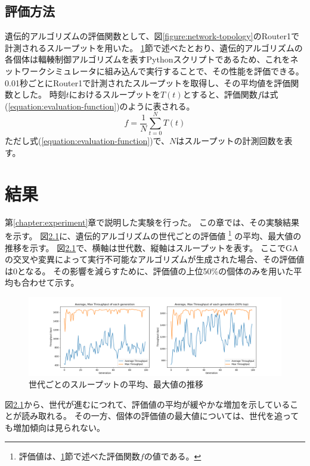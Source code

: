 \documentclass[a4paper,11pt]{jreport}
\newcommand{\figref}[1]{図\ref{#1}}
\newcommand{\chapref}[1]{第\ref{#1}章}
\newcommand{\secref}[1]{\ref{#1}節}
\newcommand{\equationref}[1]{式(\ref{#1})}
\begin{document}
\section{評価方法}
\label{section:evaluation-method}

遺伝的アルゴリズムの評価関数として、\figref{figure:network-topology}のRouter1で計測されるスループットを用いた。
\secref{section:evaluation-method}で述べたとおり、遺伝的アルゴリズムの各個体は輻輳制御アルゴリズムを表すPythonスクリプトであるため、これをネットワークシミュレータに組み込んで実行することで、その性能を評価できる。
0.01秒ごとにRouter1で計測されたスループットを取得し、その平均値を評価関数とした。
時刻$t$におけるスループットを$T(t)$とすると、評価関数$f$は\equationref{equation:evaluation-function}のように表される。
\begin{equation}
  \label{equation:evaluation-function}
  f = \frac{1}{N} \sum_{t=0}^{N} T(t)
\end{equation}
ただし\equationref{equation:evaluation-function}で、$N$はスループットの計測回数を表す。

\newpage

\chapter{結果}

\label{chapter:result}
\chapref{chapter:experiment}で説明した実験を行った。
この章では、その実験結果を示す。
\figref{figure:generation_throughput}に、遺伝的アルゴリズムの世代ごとの評価値
\footnote{評価値は、\secref{section:evaluation-method}で述べた評価関数$f$の値である。}
の平均、最大値の推移を示す。
\figref{figure:generation_throughput}で、横軸は世代数、縦軸はスループットを表す。
ここでGAの交叉や変異によって実行不可能なアルゴリズムが生成された場合、その評価値は0となる。
その影響を減らすために、評価値の上位50\%の個体のみを用いた平均も合わせて示す。
\begin{figure}[thbp]
  \setlength\fboxsep{0pt}
  \centering
  \includegraphics[width=0.9\linewidth]{fig/chap05/generation_throughput.png}
  \caption{世代ごとのスループットの平均、最大値の推移}
  \label{figure:generation_throughput}
\end{figure}
\figref{figure:generation_throughput}から、世代が進むにつれて、評価値の平均が緩やかな増加を示していることが読み取れる。
その一方、個体の評価値の最大値については、世代を追っても増加傾向は見られない。
\end{document}
